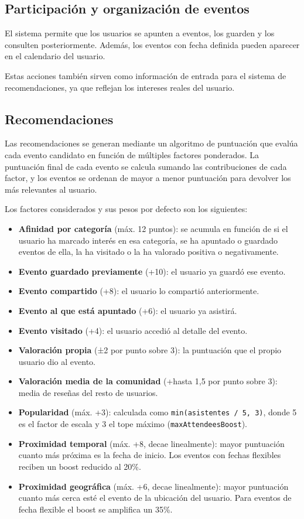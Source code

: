 \subsection{Participación y organización de eventos}

El sistema permite que los usuarios se apunten a eventos, los guarden y los consulten posteriormente. Además, los eventos con fecha definida pueden aparecer en el calendario del usuario.

Estas acciones también sirven como información de entrada para el sistema de recomendaciones, ya que reflejan los intereses reales del usuario.

\subsection{Recomendaciones}

Las recomendaciones se generan mediante un algoritmo de puntuación que evalúa cada evento candidato en función de múltiples factores ponderados. La puntuación final de cada evento se calcula sumando las contribuciones de cada factor, y los eventos se ordenan de mayor a menor puntuación para devolver los más relevantes al usuario.

Los factores considerados y sus pesos por defecto son los siguientes:

\begin{itemize}
    \item \textbf{Afinidad por categoría} (máx. 12 puntos): se acumula en función de si el usuario ha marcado interés en esa categoría, se ha apuntado o guardado eventos de ella, la ha visitado o la ha valorado positiva o negativamente.
    \item \textbf{Evento guardado previamente} (+10): el usuario ya guardó ese evento.
    \item \textbf{Evento compartido} (+8): el usuario lo compartió anteriormente.
    \item \textbf{Evento al que está apuntado} (+6): el usuario ya asistirá.
    \item \textbf{Evento visitado} (+4): el usuario accedió al detalle del evento.
    \item \textbf{Valoración propia} (±2 por punto sobre 3): la puntuación que el propio usuario dio al evento.
    \item \textbf{Valoración media de la comunidad} (+hasta 1,5 por punto sobre 3): media de reseñas del resto de usuarios.
    \item \textbf{Popularidad} (máx. +3): calculada como \texttt{min(asistentes / 5, 3)}, donde 5 es el factor de escala y 3 el tope máximo (\texttt{maxAttendeesBoost}).
    \item \textbf{Proximidad temporal} (máx. +8, decae linealmente): mayor puntuación cuanto más próxima es la fecha de inicio. Los eventos con fechas flexibles reciben un boost reducido al 20\%.
    \item \textbf{Proximidad geográfica} (máx. +6, decae linealmente): mayor puntuación cuanto más cerca esté el evento de la ubicación del usuario. Para eventos de fecha flexible el boost se amplifica un 35\%.
\end{itemize}

